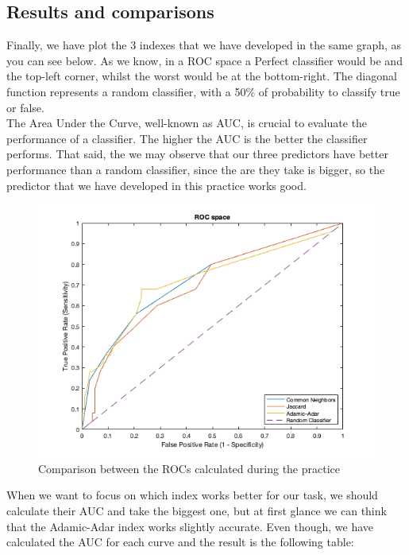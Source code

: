 \documentclass[12pt]{article}
\begin{document}
\subsection{Results and comparisons}
Finally, we have plot the 3 indexes that we have developed in the same graph, as you can see below. As we know, in a ROC space a Perfect classifier would be and the top-left corner, whilst the worst would be at the bottom-right. The diagonal function represents a random classifier, with a 50\% of probability to classify true or false.\\

The Area Under the Curve, well-known as AUC, is crucial to evaluate the performance of a classifier. The higher the AUC is the better the classifier performs. That said, the we may observe that our three predictors have better performance than a random classifier, since the are they take is bigger, so the predictor that we have developed in this practice works good.

\begin{figure}[H]
    \centering
    \includegraphics[width=13cm]{images/4.png}
    \caption{Comparison between the ROCs calculated during the practice}
    \label{fig:ROCComparison}
\end{figure}

When we want to focus on which index works better for our task, we should calculate their AUC and take the biggest one, but at first glance we can think that the Adamic-Adar index works slightly accurate. Even though, we have calculated the AUC for each curve and the result is the following table:\\
\end{document}
